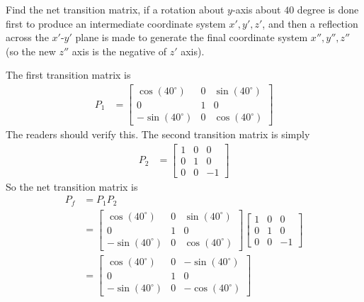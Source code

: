 \begin{exmp}
Find the net transition matrix, if a rotation about $y$-axis about $40$ degree is done first to produce an intermediate coordinate system $x', y', z'$, and then a reflection across the $x'$-$y'$ plane is made to generate the final coordinate system $x'', y'', z''$ (so the new $z''$ axis is the negative of $z'$ axis).
\end{exmp}
\begin{solution}
The first transition matrix is
\begin{align*}
P_1
&= 
\begin{bmatrix}
\cos(40^\circ) & 0 & \sin(40^\circ) \\
0 & 1 & 0 \\
-\sin(40^\circ) & 0 & \cos(40^\circ)
\end{bmatrix}
\end{align*}
The readers should verify this. The second transition matrix is simply
\begin{align*}
P_2
&= 
\begin{bmatrix}
1 & 0 & 0 \\
0 & 1 & 0 \\
0 & 0 & -1
\end{bmatrix}    
\end{align*}
So the net transition matrix is
\begin{align*}
P_f &= P_1P_2 \\
&= 
\begin{bmatrix}
\cos(40^\circ) & 0 & \sin(40^\circ) \\
0 & 1 & 0 \\
-\sin(40^\circ) & 0 & \cos(40^\circ)
\end{bmatrix}
\begin{bmatrix}
1 & 0 & 0 \\
0 & 1 & 0 \\
0 & 0 & -1
\end{bmatrix} \\
&= 
\begin{bmatrix}
\cos(40^\circ) & 0 & -\sin(40^\circ) \\
0 & 1 & 0 \\
-\sin(40^\circ) & 0 & -\cos(40^\circ)
\end{bmatrix}
\end{align*}
\end{solution}
